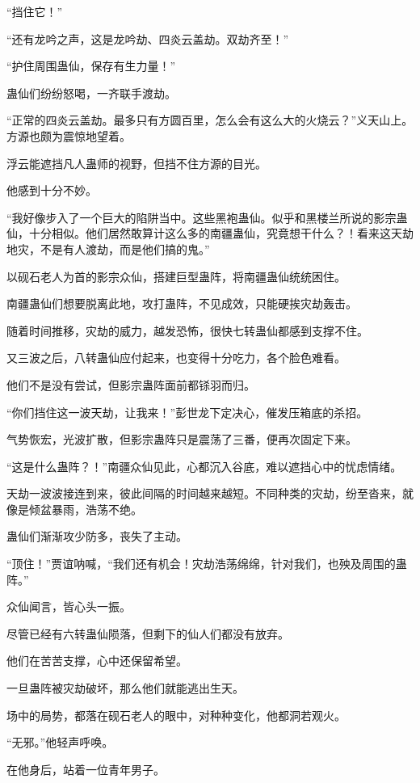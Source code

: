 \begin{this_body}
“挡住它！”

“还有龙吟之声，这是龙吟劫、四炎云盖劫。双劫齐至！”

“护住周围蛊仙，保存有生力量！”

蛊仙们纷纷怒喝，一齐联手渡劫。

“正常的四炎云盖劫。最多只有方圆百里，怎么会有这么大的火烧云？”义天山上。方源也颇为震惊地望着。

浮云能遮挡凡人蛊师的视野，但挡不住方源的目光。

他感到十分不妙。

“我好像步入了一个巨大的陷阱当中。这些黑袍蛊仙。似乎和黑楼兰所说的影宗蛊仙，十分相似。他们居然敢算计这么多的南疆蛊仙，究竟想干什么？！看来这天劫地灾，不是有人渡劫，而是他们搞的鬼。”

以砚石老人为首的影宗众仙，搭建巨型蛊阵，将南疆蛊仙统统困住。

南疆蛊仙们想要脱离此地，攻打蛊阵，不见成效，只能硬挨灾劫轰击。

随着时间推移，灾劫的威力，越发恐怖，很快七转蛊仙都感到支撑不住。

又三波之后，八转蛊仙应付起来，也变得十分吃力，各个脸色难看。

他们不是没有尝试，但影宗蛊阵面前都铩羽而归。

“你们挡住这一波天劫，让我来！”彭世龙下定决心，催发压箱底的杀招。

气势恢宏，光波扩散，但影宗蛊阵只是震荡了三番，便再次固定下来。

“这是什么蛊阵？！”南疆众仙见此，心都沉入谷底，难以遮挡心中的忧虑情绪。

天劫一波波接连到来，彼此间隔的时间越来越短。不同种类的灾劫，纷至沓来，就像是倾盆暴雨，浩荡不绝。

蛊仙们渐渐攻少防多，丧失了主动。

“顶住！”贾谊呐喊，“我们还有机会！灾劫浩荡绵绵，针对我们，也殃及周围的蛊阵。”

众仙闻言，皆心头一振。

尽管已经有六转蛊仙陨落，但剩下的仙人们都没有放弃。

他们在苦苦支撑，心中还保留希望。

一旦蛊阵被灾劫破坏，那么他们就能逃出生天。

场中的局势，都落在砚石老人的眼中，对种种变化，他都洞若观火。

“无邪。”他轻声呼唤。

在他身后，站着一位青年男子。


\end{this_body}
